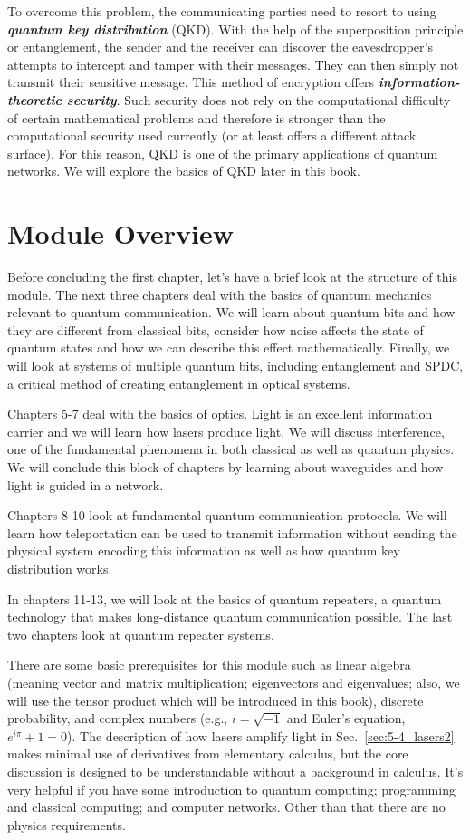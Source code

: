 To overcome this problem, the communicating parties need to resort to using \textit{\textbf{quantum key distribution}} (QKD).
With the help of the superposition principle or entanglement, the sender and the receiver can discover the eavesdropper's attempts to intercept and tamper with their messages.
They can then simply not transmit their sensitive message.
This method of encryption offers \textit{\textbf{information-theoretic security}}.
Such security does not rely on the computational difficulty of certain mathematical problems and therefore is stronger than the computational security used currently (or at least offers a different attack surface).
For this reason, QKD is one of the primary applications of quantum networks.
We will explore the basics of QKD later in this book.

\section{Module Overview}
\label{sec:mod-over}

Before concluding the first chapter, let's have a brief look at the structure of this module.
The next three chapters deal with the basics of quantum mechanics relevant to quantum communication.
We will learn about quantum bits and how they are different from classical bits, consider how noise affects the state of quantum states and how we can describe this effect mathematically.
Finally, we will look at systems of multiple quantum bits, including entanglement and SPDC, a critical method of creating entanglement in optical systems.

Chapters 5-7 deal with the basics of optics.
Light is an excellent information carrier and we will learn how lasers produce light.
We will discuss interference, one of the fundamental phenomena in both classical as well as quantum physics.
We will conclude this block of chapters by learning about waveguides and how light is guided in a network.

Chapters 8-10 look at fundamental quantum communication protocols.
We will learn how teleportation can be used to transmit information without sending the physical system encoding this information as well as how quantum key distribution works.

In chapters 11-13, we will look at the basics of quantum repeaters, a quantum technology that makes long-distance quantum communication possible.
The last two chapters look at quantum repeater systems.

There are some basic prerequisites for this module such as linear algebra (meaning vector and matrix multiplication; eigenvectors and eigenvalues; also, we will use the tensor product which will be introduced in this book), discrete probability, and complex numbers (e.g., $i = \sqrt{-1}$ and Euler's equation, $e^{i\pi} + 1 = 0$).  The description of how lasers amplify light in Sec.~\ref{sec:5-4_lasers2} makes minimal use of derivatives from elementary calculus, but the core discussion is designed to be understandable without a background in calculus.  It's very helpful if you have some introduction to quantum computing; programming and classical computing; and computer networks.
Other than that there are no physics requirements.

